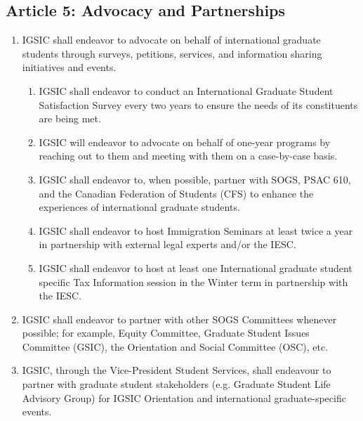 \subsection{Article 5: Advocacy and Partnerships}
\begin{enumerate}[label*=\arabic*., align=left]
\item IGSIC shall endeavor to advocate on behalf of international graduate students through
surveys, petitions, services, and information sharing initiatives and events.
\begin{enumerate}[label*=\arabic*., align=left]
\item IGSIC shall endeavor to conduct an International Graduate Student Satisfaction
Survey every two years to ensure the needs of its constituents are being met.
\item IGSIC will endeavor to advocate on behalf of one-year programs by reaching
out to them and meeting with them on a case-by-case basis.
\item IGSIC shall endeavor to, when possible, partner with SOGS, PSAC 610, and the
Canadian Federation of Students (CFS) to enhance the experiences of international
graduate students.
\item IGSIC shall endeavor to host Immigration Seminars at least twice a year in partnership with external legal experts and/or the IESC.
\item IGSIC shall endeavor to host at least one International graduate student specific Tax Information session in the Winter term in partnership with the IESC.
\end{enumerate}
\item IGSIC shall endeavor to partner with other SOGS Committees whenever possible; for example, Equity Committee, Graduate Student Issues Committee (GSIC), the Orientation and Social Committee (OSC), etc.
\item IGSIC, through the Vice-President Student Services, shall endeavour to partner with graduate student stakeholders (e.g. Graduate Student Life Advisory Group) for IGSIC Orientation and international graduate-specific events.
\end{enumerate}
